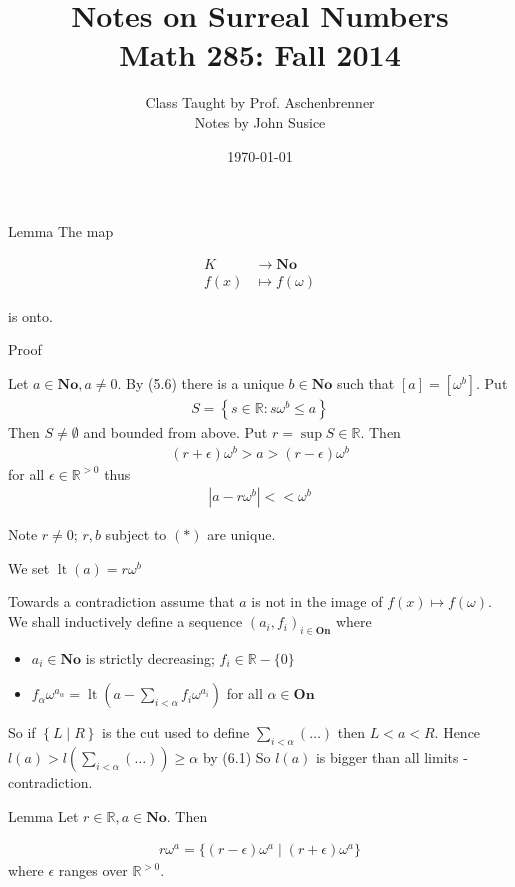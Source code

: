 \documentclass{article}
\title{Notes on Surreal Numbers \\ Math 285: Fall 2014}
\author{Class Taught by Prof. Aschenbrenner \\ Notes by John Susice}
\date{\today}
\newcommand{\R}{\mathbb{R}}
\newcommand{\No}{\mathbf{No}}
\newcommand{\On}{\mathbf{On}}
\newcommand{\paren}[1]{\left( #1 \right)}
\newcommand{\brac}[1]{\left[ #1 \right]}
\newcommand{\curly}[1]{\left\{ #1 \right\}}
\newcommand{\abs}[1]{\left| #1 \right|}
\newcommand{\arr}{\rightarrow}
\DeclareMathOperator{\lt}{lt}
\newcommand{\w}{\omega}
\begin{document}
\maketitle{}

Lemma The map

\begin{align*}
	K &\arr \No \\
	f(x) &\mapsto f(\w)
\end{align*}

is onto.

Proof

Let $a \in \No, a \neq 0$. By (5.6) there is a unique $b \in \No$ such that $\brac{a} = \brac{\w^b}$.
Put
\begin{align*}
	S = \curly{s \in \R \colon s\w^b \leq a}
\end{align*}
Then $S \neq \emptyset$ and bounded from above.
Put $r = \sup S \in \R$.
Then
\begin{align*}
	(r + \epsilon)\w^b > a > (r - \epsilon)\w^b
\end{align*}
for all $\epsilon \in \R^{>0}$
thus
\begin{align*}
	\abs{a - r\w^b} << \w^b \tag{*}
\end{align*}

Note $r \neq 0$; $r,b$ subject to $(*)$ are unique.

We set $\lt(a) = r\w^b$

Towards a contradiction assume that $a$ is not in the image of $f(x) \mapsto f(\w)$.
We shall inductively define a sequence $(a_i, f_i)_{i \in \On}$ where 

\begin{itemize}
	\item $a_i \in \No$ is strictly decreasing; $f_i \in \R - \{0\}$
	\item $f_\alpha \w^{a_\alpha} = \lt\paren{a - \sum_{i < \alpha} f_i\w^{a_i}}$ for all $\alpha \in \On$
\end{itemize}

So if $\curly{L \mid R}$ is the cut used to define $\sum_{i < \alpha} (\ldots)$ then $L < a < R$.
Hence $l(a) > l\paren{\sum_{i < \alpha} (\ldots)} \geq \alpha$ by (6.1)
So $l(a)$ is bigger than all limits - contradiction.

Lemma Let $r \in \R, a \in \No$. Then 

\begin{align*}
	r\w^a = \{(r - \epsilon) \w^a \mid (r+\epsilon)\w^a\}
\end{align*}
where $\epsilon$ ranges over $\R^{>0}$.
\end{document}
